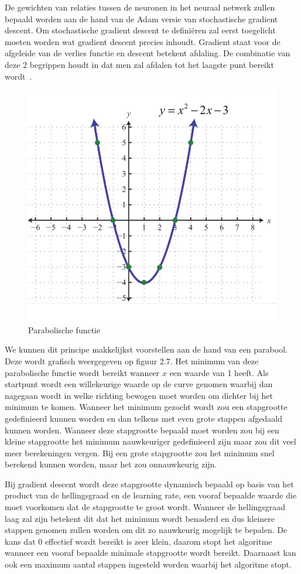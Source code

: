 De gewichten van relaties tussen de neuronen in het neuraal netwerk zullen bepaald worden aan de hand van de Adam versie van stochastische gradient descent. Om stochastische gradient descent te defini\"{e}ren zal eerst toegelicht moeten worden wat gradient descent precies inhoudt. Gradient staat voor de afgeleide van de verlies functie en descent betekent afdaling. De combinatie van deze 2 begrippen houdt in dat men zal afdalen tot het laagste punt bereikt wordt~\autocite{Srinivasan2019}.


\begin{figure}
    \centering
    \caption{Parabolische functie}
    \label{fig:parabolicfunction}
    \includegraphics[width=0.7\linewidth]{parabolicfunction}
\end{figure}

We kunnen dit principe makkelijkst voorstellen aan de hand van een parabool. Deze wordt grafisch weergegeven op figuur 2.7. Het minimum van deze parabolische functie wordt bereikt wanneer $x$ een waarde van 1 heeft. 
Als startpunt wordt een willekeurige waarde op de curve genomen waarbij dan nagegaan wordt in welke richting bewogen moet worden om dichter bij het minimum te komen. Wanneer het minimum gezocht wordt zou een stapgrootte gedefinieerd kunnen worden en dan telkens met even grote stappen afgedaald kunnen worden. Wanneer deze stapgrootte bepaald moet worden zou bij een kleine stapgrootte het minimum nauwkeuriger gedefinieerd zijn maar zou dit veel meer berekeningen vergen. Bij een grote stapgrootte zou het minimum snel berekend kunnen worden, maar het zou onnauwkeurig zijn. 

Bij gradient descent wordt deze stapgrootte dynamisch bepaald op basis van het product van de hellingsgraad en de learning rate, een vooraf bepaalde waarde die moet voorkomen dat de stapgrootte te groot wordt. Wanneer de hellingsgraad laag zal zijn betekent dit dat het minimum wordt benaderd en dus kleinere stappen genomen zullen worden om dit zo nauwkeurig mogelijk te bepalen. De kans dat 0 effectief wordt bereikt is zeer klein, daarom stopt het algoritme wanneer een vooraf bepaalde minimale stapgrootte wordt bereikt. Daarnaast kan ook een maximum aantal stappen ingesteld worden waarbij het algoritme stopt. 

